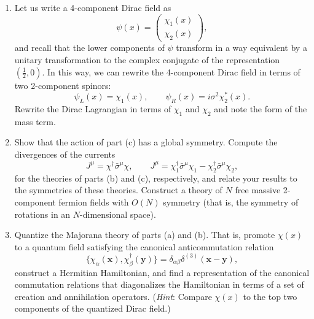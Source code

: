 \begin{enumerate}[label=(\alph*)]
\begin{equation}
      S = \int d^4x\ \Bigl[ \chi^{\dagger}i\bar{\sigma}\cdot\partial\chi
        + \tfrac{im}{2}\bigl( \chi^T\sigma^2\chi - \chi^{\dagger}\sigma^2
          \chi^{*} \bigr) \Bigr]
    \end{equation}
    (where $\chi^{\dagger} = (\chi^{*})^T$) is real ($S^{*} = S$), and that
    varying this $S$ with respect to $\chi$ and $\chi^{*}$ yields the
    Majorana equation.
  \item Let us write a 4-component Dirac field as
    \begin{equation}
      \psi(x) = \begin{pmatrix}\chi_1(x)\\ \chi_2(x)\end{pmatrix},
    \end{equation}
    and recall that the lower components of $\psi$ transform in a way
    equivalent by a unitary transformation to the complex conjugate of the
    representation $(\tfrac{1}{2}, 0)$.  In this way, we can rewrite the
    4-component Dirac field in terms of two 2-component spinors:
    \begin{equation}
      \psi_L(x) = \chi_1(x),\qquad
      \psi_R(x) = i\sigma^2\chi_2^{*}(x) .
    \end{equation}
    Rewrite the Dirac Lagrangian in terms of $\chi_1$ and $\chi_2$ and note
    the form of the mass term.
  \item Show that the action of part (c) has a global symmetry.  Compute the
    divergences of the currents
    \begin{equation}
      J^\mu = \chi^{\dagger}\bar{\sigma}^\mu\chi,\qquad
      J^\mu = \chi_1^{\dagger}\bar{\sigma}^\mu\chi_1
        - \chi_2^{\dagger}\bar{\sigma}^\mu\chi_2,
    \end{equation}
    for the theories of parts (b) and (c), respectively, and relate your
    results to the symmetries of these theories.  Construct a theory of $N$
    free massive 2-component fermion fields with $O(N)$ symmetry (that is,
    the symmetry of rotations in an $N$-dimensional space).
  \item Quantize the Majorana theory of parts (a) and (b).  That is, promote
    $\chi(x)$ to a quantum field satisfying the canonical anticommutation
    relation
    \begin{equation}
      \{\chi_\alpha(\mathbf{x}), \chi_\beta^{\dagger}(\mathbf{y})\}
        = \delta_{\alpha\beta}\delta^{(3)}(\mathbf{x}-\mathbf{y}),
    \end{equation}
    construct a Hermitian Hamiltonian, and find a representation of the
    canonical commutation relations that diagonalizes the Hamiltonian in
    terms of a set of creation and annihilation operators.  (\emph{Hint}:
    Compare $\chi(x)$ to the top two components of the quantized Dirac
    field.)
\end{enumerate}

